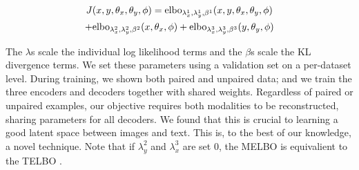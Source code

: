 \documentclass{article}
\begin{document}
\begin{multline}
    J(x, y, \theta_{x}, \theta_{y}, \phi) = \textup{elbo}_{\lambda_{x}^{1}, \lambda_{y}^{1}, \beta^{1}}(x, y, \theta_{x}, \theta_{y}, \phi) \\ + \textup{elbo}_{\lambda_{x}^{2}, \lambda_{y}^{2}, \beta^{2}}(x, \theta_{x}, \phi) + \textup{elbo}_{\lambda_{x}^{3}, \lambda_{y}^{3}, \beta^{3}}(y, \theta_{y}, \phi)
\end{multline}

The $\lambda$s scale the individual log likelihood terms and the $\beta$s scale the KL divergence terms. We set these parameters using a validation set on a per-dataset level. During training, we shown both paired and unpaired data; and we train the three encoders and decoders together with shared weights. Regardless of paired or unpaired examples, our objective requires both modalities to be reconstructed, sharing parameters for all decoders. We found that this is crucial to learning a good latent space between images and text. This is, to the best of our knowledge, a novel technique. Note that if $\lambda_{y}^{2}$ and $\lambda_{x}^{3}$ are set 0, the MELBO is equivalient to the TELBO \cite{hinton2006training}.
\end{document}
